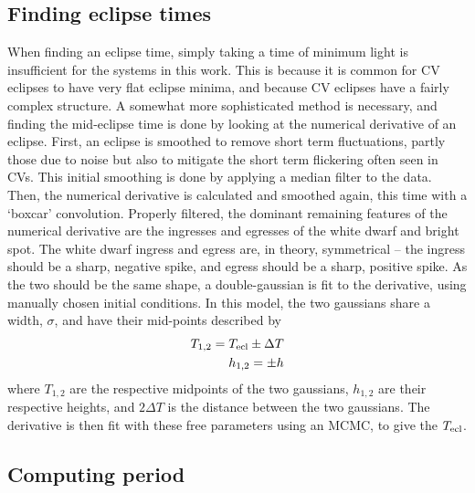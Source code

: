 \subsection{Finding eclipse times}
\label{sect:modelling:finding eclipse times}

When finding an eclipse time, simply taking a time of minimum light is insufficient for the systems in this work. This is because it is common for CV eclipses to have very flat eclipse minima, and because CV eclipses have a fairly complex structure.
A somewhat more sophisticated method is necessary, and finding the mid-eclipse time is done by looking at the numerical derivative of an eclipse.
First, an eclipse is smoothed to remove short term fluctuations, partly those due to noise but also to mitigate the short term flickering often seen in CVs. This initial smoothing is done by applying a median filter to the data. Then, the numerical derivative is calculated and smoothed again, this time with a `boxcar' convolution. Properly filtered, the dominant remaining features of the numerical derivative are the ingresses and egresses of the white dwarf and bright spot.
The white dwarf ingress and egress are, in theory, symmetrical -- the ingress should be a sharp, negative spike, and egress should be a sharp, positive spike. As the two should be the same shape, a double-gaussian is fit to the derivative, using manually chosen initial conditions. In this model, the two gaussians share a width, $\sigma$, and have their mid-points described by
\begin{align*}
    T_{\rm 1,2} = T_{\rm ecl} \pm \Delta T \\
    h_{\rm 1,2} = \pm h
\end{align*}
where $T_{1,2}$ are the respective midpoints of the two gaussians, $h_{1,2}$ are their respective heights, and $2\Delta T$ is the distance between the two gaussians.
The derivative is then fit with these free parameters using an MCMC, to give the $T_{\rm ecl}$.

\subsection{Computing period}
\label{sect:modelling:Computing ephemeris}

